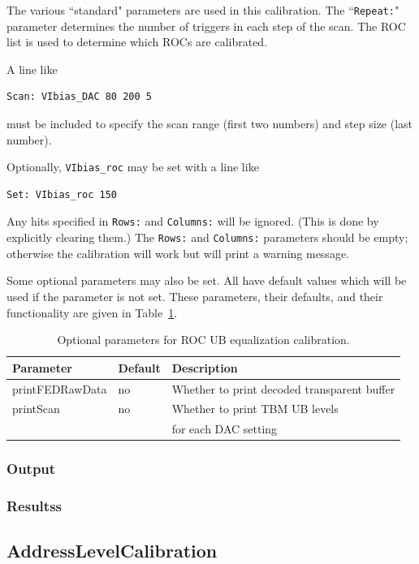 The various ``standard" parameters are used in this calibration.  The ``\verb|Repeat:|" parameter determines the number of triggers in each step of the scan.  The ROC list is used to determine which ROCs are calibrated.

A line like
\begin{verbatim}
Scan: VIbias_DAC 80 200 5
\end{verbatim}
must be included to specify the scan range (first two numbers) and step
size (last number).

Optionally, \verb|VIbias_roc| may be set with a line like
\begin{verbatim}
Set: VIbias_roc 150
\end{verbatim}

Any hits specified in \verb|Rows:| and \verb|Columns:| will be ignored.  (This is done by explicitly clearing them.)  The \verb|Rows:| and \verb|Columns:| parameters should be empty; otherwise the calibration will work but will print a warning message.

Some optional parameters may also be set.  All have default values which will be used if the parameter is not set.  These parameters, their defaults, and their functionality are given in Table~\ref{tab:ROCUBParameters}.

\begin{table}
\centering
\caption{Optional parameters for ROC UB equalization calibration.}
\label{tab:ROCUBParameters}
\begin{tabular}{l@{~~~~}l@{~~~~}l}
\hline
\hline
Parameter & Default & Description \\
\hline
printFEDRawData      & no                 & Whether to print decoded transparent buffer \\
printScan            & no                 & Whether to print TBM UB levels \\
                     &                    & for each DAC setting \\
\hline
\hline
\end{tabular}
\end{table}

\subsubsection{Output}
\subsubsection{Resultss}

\subsection{AddressLevelCalibration}

